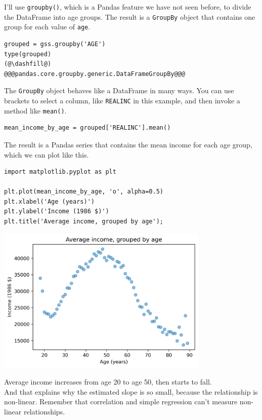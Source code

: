 I'll use \passthrough{\lstinline!groupby()!}, which is a Pandas feature
we have not seen before, to divide the DataFrame into age groups. The
result is a \passthrough{\lstinline!GroupBy!} object that contains one
group for each value of \passthrough{\lstinline!age!}.

\begin{lstlisting}[]
grouped = gss.groupby('AGE')
type(grouped)
(@\dashfill@)
@@@pandas.core.groupby.generic.DataFrameGroupBy@@@
\end{lstlisting}

The \passthrough{\lstinline!GroupBy!} object behaves like a DataFrame in
many ways. You can use brackets to select a column, like
\passthrough{\lstinline!REALINC!} in this example, and then invoke a
method like \passthrough{\lstinline!mean()!}.

\begin{lstlisting}[]
mean_income_by_age = grouped['REALINC'].mean()
\end{lstlisting}

The result is a Pandas series that contains the mean income for each age
group, which we can plot like this.

\begin{lstlisting}[]
import matplotlib.pyplot as plt

plt.plot(mean_income_by_age, 'o', alpha=0.5)
plt.xlabel('Age (years)')
plt.ylabel('Income (1986 $)')
plt.title('Average income, grouped by age');
\end{lstlisting}

\begin{center}
\includegraphics[width=4in]{chapters/10_regression_files/10_regression_36_0.png}
\end{center}

Average income increases from age 20 to age 50, then starts to fall.\\
And that explains why the estimated slope is so small, because the
relationship is non-linear. Remember that correlation and simple
regression can't measure non-linear relationships.

